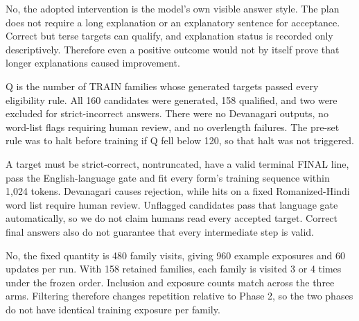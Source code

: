 \medskip{}\par\nopagebreak

No, the adopted intervention is the model's own visible answer style. The plan does not require a long explanation or an explanatory sentence for acceptance. Correct but terse targets can qualify, and explanation status is recorded only descriptively. Therefore even a positive outcome would not by itself prove that longer explanations caused improvement.

\medskip{}\par\nopagebreak

Q is the number of TRAIN families whose generated targets passed every eligibility rule. All 160 candidates were generated, 158 qualified, and two were excluded for strict-incorrect answers. There were no Devanagari outputs, no word-list flags requiring human review, and no overlength failures. The pre-set rule was to halt before training if Q fell below 120, so that halt was not triggered.

\medskip{}\par\nopagebreak

A target must be strict-correct, nontruncated, have a valid terminal FINAL line, pass the English-language gate and fit every form's training sequence within 1,024 tokens. Devanagari causes rejection, while hits on a fixed Romanized-Hindi word list require human review. Unflagged candidates pass that language gate automatically, so we do not claim humans read every accepted target. Correct final answers also do not guarantee that every intermediate step is valid.

\medskip{}\par\nopagebreak

No, the fixed quantity is 480 family visits, giving 960 example exposures and 60 updates per run. With 158 retained families, each family is visited 3 or 4 times under the frozen order. Inclusion and exposure counts match across the three arms. Filtering therefore changes repetition relative to Phase 2, so the two phases do not have identical training exposure per family.

\medskip{}\par\nopagebreak

